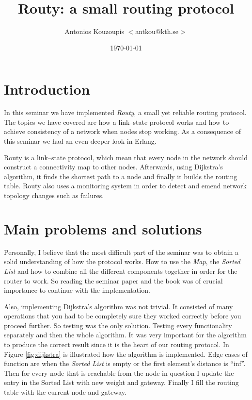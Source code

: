 \documentclass[a4paper, 11pt]{article}
\title{Routy: a small routing protocol}
\author{Antonios Kouzoupis $<$antkou$@$kth.se$>$}
\date{\today{}}
\begin{document}
\maketitle

\section{Introduction}

In this seminar we have implemented \emph{Routy}, a small yet reliable routing
protocol. The topics we have covered are how a link--state protocol works and how
to achieve consistency of a network when nodes stop working. As a consequence of
this seminar we had an even deeper look in Erlang.

Routy is a link--state protocol, which mean that every node in the network
should construct a connectivity map to other nodes. Afterwards, using
Dijkstra's algorithm, it finds the shortest path to a node and finally it builds
the routing table. Routy also uses a monitoring system in order to detect and
emend network topology changes such as failures.

\section{Main problems and solutions}

Personally, I believe that the  most difficult part of the seminar was to obtain a
solid understanding of how the protocol works. How to use the \emph{Map}, the
\emph{Sorted List} and how to combine all the different components together in
order for the router to work. So reading the seminar paper and the book was of
crucial importance to continue with the implementation.

Also, implementing Dijkstra's algorithm was not trivial. It consisted of many
operations that you had to be completely sure they worked correctly before you
proceed further. So testing was the only solution. Testing every functionality
separately and then the whole algorithm. It was very important for the algorithm
to produce the correct result since it is the heart of our routing protocol.
In Figure \ref{fig:dijkstra} is illustrated how the algorithm is implemented.
Edge cases of function are when the \emph{Sorted List} is empty or the first
element's distance is ``inf''. Then for every node that is reachable from the
node in question I update the entry in the Sorted List with new weight and
gateway. Finally I fill the routing table with the current node and gateway.
\end{document}
